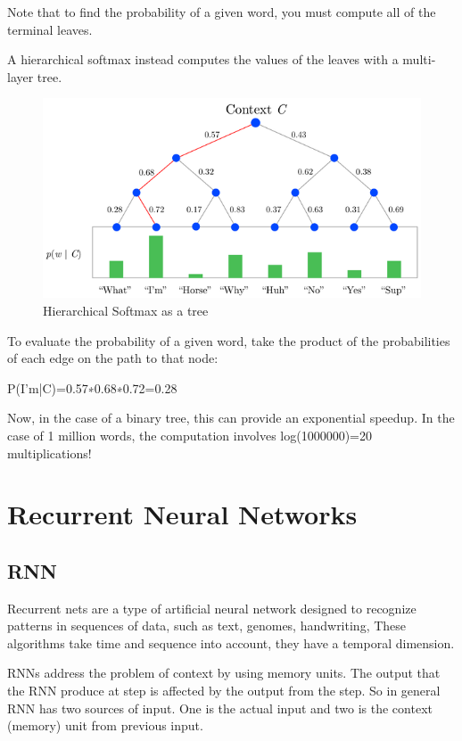 Note that to find the probability of a given word, you must compute all of the terminal leaves.

A hierarchical softmax instead computes the values of the leaves with a multi-layer tree.

\begin{figure}[ht]
    \centering
    \includegraphics[scale=0.7]{Images/hsmx2.png}
    \caption{Hierarchical Softmax as a tree}
    \label{fig:smxtree}
\end{figure}

To evaluate the probability of a given word, take the product of the probabilities of each edge on the path to that node:

P(I'm|C)=0.57∗0.68∗0.72=0.28

Now, in the case of a binary tree, this can provide an exponential speedup. In the case of 1 million words, the computation involves log(1000000)=20 multiplications!


\section{Recurrent Neural Networks}
\subsection{RNN}

Recurrent nets are a type of artificial neural network designed to recognize patterns in sequences of data, such as text, genomes, handwriting, These algorithms take time and sequence into account, they have a temporal dimension.

RNNs address the problem of context by using memory units. The output that the RNN produce at step is affected by the output from the step. So in general RNN has two sources of input. One is the actual input and two is the context (memory) unit from previous input.

